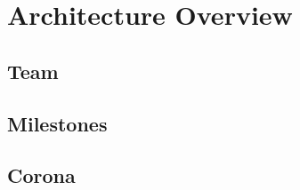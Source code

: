 \documentclass[main.tex]{subfiles}
\begin{document}
	\begingroup

	\renewcommand{\cleardoublepage}{}

	\renewcommand{\clearpage}{}

	\chapter{Architecture Overview}

		\chapterauthor{}
		
		\section{Team}
		
		
		\section{Milestones}
		
		\section{Corona}
	  	

	\endgroup
\end{document}
